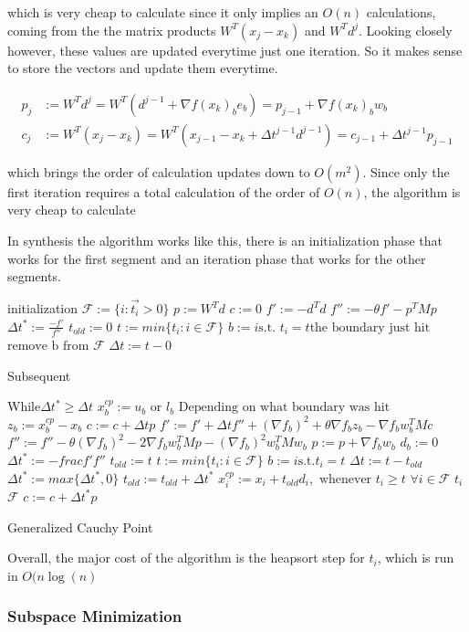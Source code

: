 which is very cheap to calculate since it only implies an $O(n)$ calculations, coming from the the matrix products $W^T(x_j - x_k)$ and $W^Td^j$.  Looking closely however, these values are updated everytime just one iteration.  So it makes sense to store the vectors and update them everytime.

\begin{align} \label{cp}
  p_j & := W^Td^j = W^T(d^{j-1} + \nabla f(x_k)_b e_b) = p_{j-1} + \nabla f(x_k)_b w_b \\
  c_j & := W^T(x_j - x_k) = W^T(x_{j-1} - x_k + \Delta t^{j-1} d^{j-1}) = c_{j-1} + \Delta t^{j-1} p_{j-1}
\end{align}

which brings the order of calculation updates down to $O(m^2)$.  Since only the first iteration requires a total calculation of the order of $O(n)$, the algorithm is very cheap to calculate

In synthesis the algorithm works like this, there is an initialization phase that works for the first segment and an iteration phase that works for the other segments.

\linesnumbered
\begin{algorithm}[H]
 \SetLine %
 
 initialization\;
 $\mathcal{F} := \{i: \vec{t_i} > 0\}$\;
 $p := W^Td$\;
 $c := 0$\;
 $f' := -d^Td$\;
 $f'' := - \theta f' - p^TMp$\;
 $\Delta t^* := \frac{-f'}{f''}$\;
 $t_{old} := 0$\;
 $t := min\{t_i: i \in \mathcal{F} \}$\;
 $b := i \text{s.t. } t_i = t \text{the boundary just hit}$\;
 $\text{remove b from } \mathcal{F}$\;
 $\Delta t := t - 0$\;
 
 Subsequent\;
 
 While{$\Delta t^* \geq \Delta t$}{
   $x_b^{cp} := u_b \text{ or } l_b \text{ Depending on what boundary was hit}$\;
   $z_b := x_b^{cp} - x_b$\; 
   $c := c + \Delta t p$\;
   $f' := f' + \Delta t f'' + (\nabla f_b)^2 + \theta \nabla f_b z_b - \nabla f_bw_b^TMc$\;
   $f'' := f'' - \theta (\nabla f_b)^2 - 2 \nabla f_bw_b^TMp - (\nabla f_b)^2 w_b^T M w_b$\;
   $p := p + \nabla f_b w_b$\;
   $d_b := 0$\;
   $\Delta t^* := -frac{f'}{f''}$\;
   $t_{old} := t$\;
   $t := min \{ t_i : i \in \mathcal{F}\}$\;
   $b := i \text{s.t.} t_i = t$\;
   $\Delta t := t - t_{old}$\;
 }
 $\Delta t^* := max \{ \Delta t^*, 0\}$\;
 $t_{old} := t_{old} + \Delta t^*$\;
 $x_i^{cp} := x_i + t_{old}d_i, \text{ whenever } t_i \geq t$\;
 $\forall i \in \mathcal{F}$  $t_i$  $\mathcal{F}$\;
 $c := c + \Delta t^* p$\;
 \caption{Generalized Cauchy Point\label{CPalgo}}
\end{algorithm}

Overall, the major cost of the algorithm is the heapsort step for $t_i$, which is run in $O(n \log(n)$

\subsubsection{Subspace Minimization}
